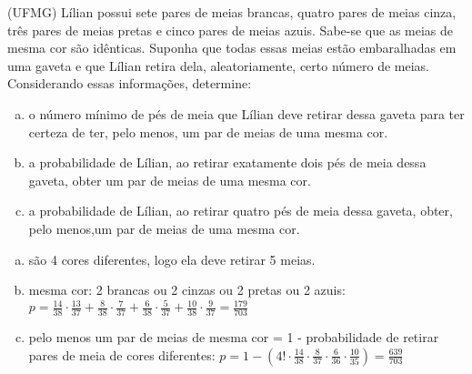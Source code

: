 \begin{ex}
(UFMG) Lílian possui sete pares de meias brancas, quatro pares de meias cinza, três pares de
meias pretas e cinco pares de meias azuis.
Sabe-se que as meias de mesma cor são idênticas.
Suponha que todas essas meias estão embaralhadas em uma gaveta e que Lílian retira
dela, aleatoriamente, certo número de meias.
Considerando essas informações, determine:
 \begin{enumerate}  [(a)]
     \item o número mínimo de pés de meia que Lílian deve retirar dessa gaveta para ter certeza de ter, pelo menos, um par de meias de uma mesma cor.
     \item a probabilidade de Lílian, ao retirar exatamente dois pés de meia dessa gaveta, obter um par de meias de uma mesma cor.
     \item a probabilidade de Lílian, ao retirar quatro pés de meia dessa gaveta, obter, pelo menos,um par de meias de uma mesma cor.
 \end{enumerate}
   \begin{sol}
    \phantom{A}
      \begin{enumerate} [(a)]
          \item são 4 cores diferentes, logo ela deve retirar 5 meias.
          \item mesma cor: 2 brancas ou 2 cinzas ou 2 pretas ou 2 azuis:\\
          $p=\frac{14}{38}\cdot\frac{13}{37}+\frac{8}{38}\cdot\frac{7}{37}+\frac{6}{38}\cdot\frac{5}{37}+\frac{10}{38}\cdot\frac{9}{37}=\frac{179}{703}$
          \item pelo menos um par de meias de mesma cor = 1 - probabilidade de retirar pares de meia de cores diferentes: \hspace{0,4cm}
          $p= 1-(4!\cdot\frac{14}{38}\cdot\frac{8}{37}\cdot\frac{6}{36}\cdot\frac{10}{35})=\frac{639}{703}$
      \end{enumerate}
   \end{sol}
 \end{ex}